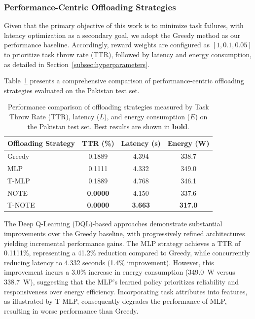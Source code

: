 \documentclass[preprint,3p,authoryear]{elsarticle}
\begin{document}
\subsubsection{Performance-Centric Offloading Strategies}\label{subsec:comparison_of_offloading_strategies}

Given that the primary objective of this work is to minimize task failures, with latency optimization as a secondary goal, we adopt the Greedy method as our performance baseline. Accordingly, reward weights are configured as $[1, 0.1, 0.05]$ to prioritize task throw rate (TTR), followed by latency and energy consumption, as detailed in Section~\ref{subsec:hyperparameters}.

Table~\ref{tab:results_comparison} presents a comprehensive comparison of performance-centric offloading strategies evaluated on the Pakistan test set.


\begin{table}[htbp]
\centering
\begin{tabular}{lccc}
\toprule
\textbf{Offloading Strategy} & \textbf{TTR (\%)} & \textbf{Latency (s)} & \textbf{Energy (W)} \\
\midrule
Greedy 
 & 0.1889
 & 4.394
 & 338.7 \\
\midrule
MLP 
 & 0.1111
 & 4.332
 & 349.0 \\
T-MLP 
 & 0.1889
    & 4.768
    & 346.1 \\
NOTE 
 & \textbf{0.0000} 
 & 4.150
 & 337.6 \\
T-NOTE 
 & \textbf{0.0000} 
 & \textbf{3.663} 
 & \textbf{317.0} \\
\bottomrule
\end{tabular}
\caption{Performance comparison of offloading strategies measured by Task Throw Rate (TTR), latency ($L$), and energy consumption ($E$) on the Pakistan test set. Best results are shown in \textbf{bold}.}
\label{tab:results_comparison}
\end{table}


The Deep Q-Learning (DQL)-based approaches demonstrate substantial improvements over the Greedy baseline, with progressively refined architectures yielding incremental performance gains. The MLP strategy achieves a TTR of 0.1111\%, representing a 41.2\% reduction compared to Greedy, while concurrently reducing latency to 4.332 seconds (1.4\% improvement). However, this improvement incurs a 3.0\% increase in energy consumption (349.0~W versus 338.7~W), suggesting that the MLP's learned policy prioritizes reliability and responsiveness over energy efficiency. Incorporating task attributes into features, as illustrated by T-MLP, consequently degrades the performance of MLP, resulting in worse performance than Greedy.
\end{document}
